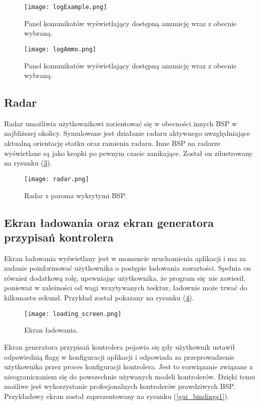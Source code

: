 \begin{figure}
	\centering
	\texttt{[image: logExample.png]}
	\caption{Panel komunikatów wyświetlający dostępną amunicję wraz z obecnie wybraną.}
	\label{logExample}
\end{figure}

\begin{figure}
	\centering
	\texttt{[image: logAmmo.png]}
	\caption{Panel komunikatów wyświetlający dostępną amunicję wraz z obecnie wybraną.}
	\label{logAmmo}
\end{figure}


\subsection{Radar}

Radar umożliwia użytkownikowi zorientować się w obecności innych BSP w najbliższej okolicy. Symulowane jest działanie radaru aktywnego uwzględniające aktualną orientację statku oraz ramienia radaru. Inne BSP na radarze wyświetlane są jako kropki po pewnym czasie zanikające. Został on zilustrowany na rysunku (\ref{radar}).


\begin{figure}[h]
	\centering
	\texttt{[image: radar.png]}
	\caption{Radar z paroma wykrytymi BSP.}
	\label{radar}
\end{figure}

\subsection{Ekran ładowania oraz ekran generatora przypisań kontrolera}
	
Ekran ładowania wyświetlany jest w momencie uruchomienia aplikacji i ma za zadanie poinformować użytkownika o postępie ładowania zawartości. Spełnia on również dodatkową rolę, upewniając użytkownika, że program się nie zawiesił, ponieważ w zależności od wagi wczytywanych tesktur, ładownie może trwać do kilkunastu sekund. Przykład został pokazany na rysunku (\ref{gui_loading}).

\begin{figure}[!h]
	\centering
	\texttt{[image: loading\_screen.png]}
	\caption{Ekran ładowania.}
	\label{gui_loading}
\end{figure}

Ekran generatora przypisań kontrolera pojawia się gdy użytkownik ustawił odpowiednią flagę w konfiguracji aplikacji i odpowiada za przeprowadzenie użytkownika przez proces konfiguracji kontrolera. Jest to rozwiązanie związane z nieograniczaniem się do powszechnie używanych modeli kontrolerów. Dzięki temu możliwe jest wykorzystanie profesjonalnych kontrolerów prawdziwych BSP. Przykładowy ekran został zaprezentowany na rysunku (\ref{gui_bindings1}).


